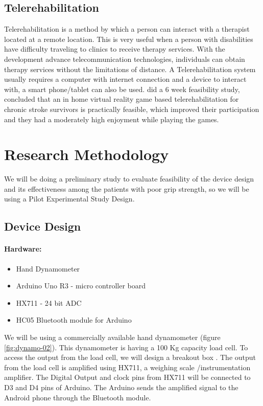 \documentclass[12pt]{article}
\begin{document}
 \subsection{Telerehabilitation}
Telerehabilitation is a method by which a person can interact with a therapist   located at a remote location. This is very useful when a person with disabilities have difficulty traveling to clinics to receive therapy services. With the development advance telecommunication technologies, individuals can obtain therapy services without the limitations of distance.  A Telerehabilitation system usually requires a computer with internet connection and a device to interact with, a smart phone/tablet can also be used. \citet{proffitt2015feasibility} did a 6 week  feasibility study, concluded that an in home virtual reality game based telerehabilitation for chronic stroke survivors is practically feasible, which improved their participation and they had a moderately high enjoyment while playing the games.


\section{Research Methodology}
 We will be  doing a preliminary study to evaluate feasibility of the device design and its effectiveness among the patients with poor grip strength, so we will be using a Pilot Experimental Study Design.
\subsection{Device Design}
\paragraph{Hardware:} 
\begin{itemize}
	\item Hand Dynamometer
	\item Arduino Uno R3 - micro controller board
	\item HX711  - 24 bit ADC 
	\item HC05 Bluetooth module for Arduino 
\end{itemize}
We will be using a commercially available hand dynamometer (figure \ref{fig:dynamo-02}). This dynamometer is having a 100 Kg capacity load cell. To access the output from the load cell, we will design a breakout box . The output from the load cell is amplified using HX711, a weighing scale /instrumentation amplifier. The Digital Output and clock pins from HX711 will be connected to D3 and D4 pins of Arduino. The Arduino sends the amplified signal to the Android phone through the Bluetooth module. 
\end{document}
